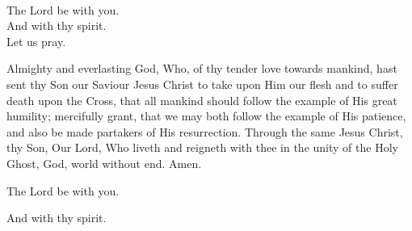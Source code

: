 \\
  \rubric{\Vbar}The Lord be with you.
\\
  \rubric{\Rbar}And with thy spirit.
\\
Let us pray.

Almighty and everlasting God, Who, of thy tender love towards mankind, hast sent thy Son our Saviour Jesus Christ to take upon Him our flesh and to suffer death upon the Cross, that all mankind should follow the example of His great humility; mercifully grant, that we may both follow the example of His patience, and also be made partakers of His resurrection. Through the same Jesus Christ, thy Son, Our Lord, Who liveth and reigneth with thee in the unity of the Holy Ghost, God, world without end.\rubric{\Rbar} Amen.

  \rubric{\Vbar}The Lord be with you.

  \rubric{\Rbar}And with thy spirit.

